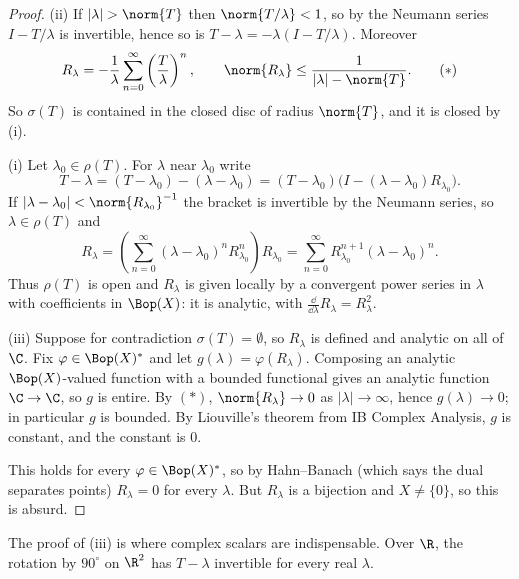 \begin{proof}
	(ii) If $|\lambda|>\norm{T}$ then $\norm{T/\lambda}<1$, so by the Neumann series $I - T/\lambda$ is invertible, hence so is $T - \lambda = -\lambda(I - T/\lambda)$. Moreover
	\begin{equation*}
		R_\lambda = -\frac{1}{\lambda}\sum_{n=0}^\infty \left(\frac{T}{\lambda}\right)^n, \qquad \norm{R_\lambda}\leq\frac{1}{|\lambda|-\norm{T}}. \tag{$*$}
	\end{equation*}
	So $\sigma(T)$ is contained in the closed disc of radius $\norm{T}$, and it is closed by (i).

	(i) Let $\lambda_0\in\rho(T)$. For $\lambda$ near $\lambda_0$ write
	$$T - \lambda = (T-\lambda_0) - (\lambda - \lambda_0) = (T-\lambda_0)\big( I - (\lambda-\lambda_0)R_{\lambda_0}\big).$$
	If $|\lambda - \lambda_0| < \norm{R_{\lambda_0}}^{-1}$ the bracket is invertible by the Neumann series, so $\lambda \in\rho(T)$ and
	$$R_\lambda = \left( \sum_{n=0}^\infty (\lambda-\lambda_0)^n R_{\lambda_0}^n \right) R_{\lambda_0} = \sum_{n=0}^\infty R_{\lambda_0}^{n+1}(\lambda-\lambda_0)^n.$$
	Thus $\rho(T)$ is open and $R_\lambda$ is given locally by a convergent power series in $\lambda$ with coefficients in $\Bop(X)$: it is analytic, with $\frac{\dd}{\dd\lambda}R_\lambda = R_\lambda^2$.

	(iii) Suppose for contradiction $\sigma(T)=\emptyset$, so $R_\lambda$ is defined and analytic on all of $\C$. Fix $\varphi \in \Bop(X)^*$ and let $g(\lambda) = \varphi(R_\lambda)$. Composing an analytic $\Bop(X)$-valued function with a bounded functional gives an analytic function $\C\to\C$, so $g$ is entire. By $(*)$, $\norm{R_\lambda}\to0$ as $|\lambda|\to\infty$, hence $g(\lambda)\to0$; in particular $g$ is bounded. By Liouville's theorem from IB Complex Analysis, $g$ is constant, and the constant is $0$.

	This holds for every $\varphi \in \Bop(X)^*$, so by Hahn--Banach (which says the dual separates points) $R_\lambda = 0$ for every $\lambda$. But $R_\lambda$ is a bijection and $X \neq \{0\}$, so this is absurd.
\end{proof}

\begin{remark}
	The proof of (iii) is where complex scalars are indispensable. Over $\R$, the rotation by $90^\circ$ on $\R^2$ has $T-\lambda$ invertible for every real $\lambda$.
\end{remark}

